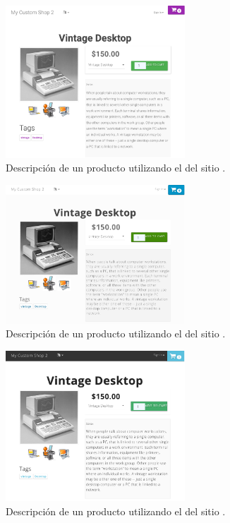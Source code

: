 	\begin{figure}[H]
		\centering
		\includegraphics[width=0.6\textwidth]{figuras/bootstrap/bootstrap_theme_paper.png}

		\caption{Descripción de un producto utilizando el \themeCPT \textbf{\themePaper} del sitio \bootswatchNAME.}
		\label{figure:bootstrap:theme_paper}
	\end{figure}

	\begin{figure}[H]
		\centering
		\includegraphics[width=0.6\textwidth]{figuras/bootstrap/bootstrap_theme_simplex.png}

		\caption{Descripción de un producto utilizando el \themeCPT \textbf{\themeSimplex} del sitio \bootswatchNAME.}
		\label{figure:bootstrap:theme_simplex}
	\end{figure}

	\begin{figure}[H]
		\centering
		\includegraphics[width=0.6\textwidth]{figuras/bootstrap/bootstrap_theme_yeti.png}

		\caption{Descripción de un producto utilizando el \themeCPT \textbf{\themeYeti} del sitio \bootswatchNAME.}
		\label{figure:bootstrap:theme_yeti}
	\end{figure}